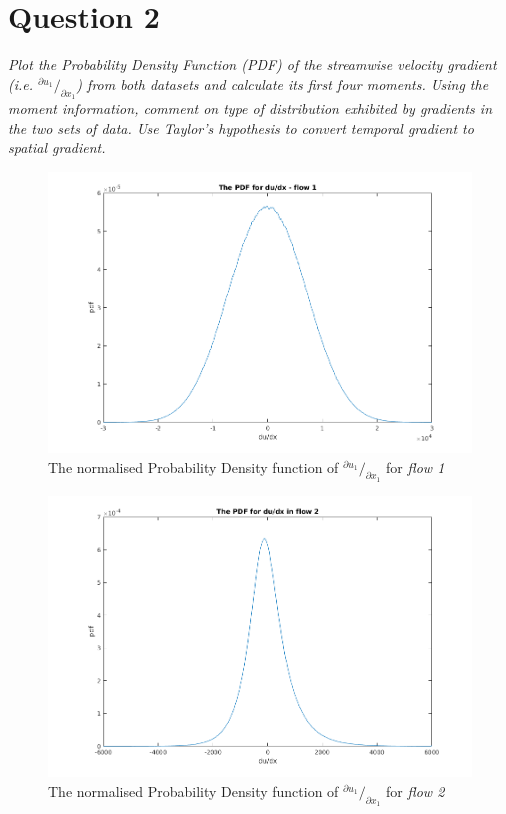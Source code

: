 \section*{Question 2}

\textit{ Plot the Probability Density Function (PDF) of the streamwise velocity gradient (i.e. $^{\partial u_1} / _{\partial x_1}$) from both datasets and calculate its first four moments. Using the moment information, comment on type of distribution exhibited by gradients in the two sets of data. Use Taylor’s hypothesis to convert temporal gradient to spatial gradient.}

\begin{figure}[!ht]
\centering
\includegraphics[scale=0.5]{./TEXT/dudx-pdf1.png}
\caption{The normalised Probability Density function of $^{\partial u_1} / _{\partial x_1}$ for \emph{flow 1}}
\label{dudx1}
\end{figure}

\begin{figure}[!ht]
\centering
\includegraphics[scale=0.5]{./TEXT/dudx-pdf2.png}
\caption{The normalised Probability Density function of $^{\partial u_1} / _{\partial x_1}$ for \emph{flow 2}}
\label{dudx2}
\end{figure}

